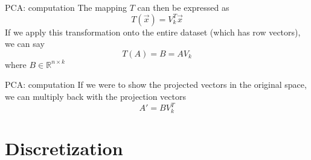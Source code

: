 \documentclass{beamer}
\begin{document}
	\begin{frame}{PCA: computation}
	The mapping $T$ can then be expressed as
	\[ T(\vec{x}) = V_k^T \vec{x} \]
	If we apply this transformation onto the entire dataset (which has row vectors), we can say
	\[ T(A) = B = A V_k \]
	where $B \in \mathbb{R}^{n \times k}$
	\end{frame}
	\begin{frame}{PCA: computation}
	If we were to show the projected vectors in the original space, we can multiply back with the projection vectors
	\[ A' = B V_k^T \]
	\end{frame}

	\section{Discretization}
	
\end{document}
